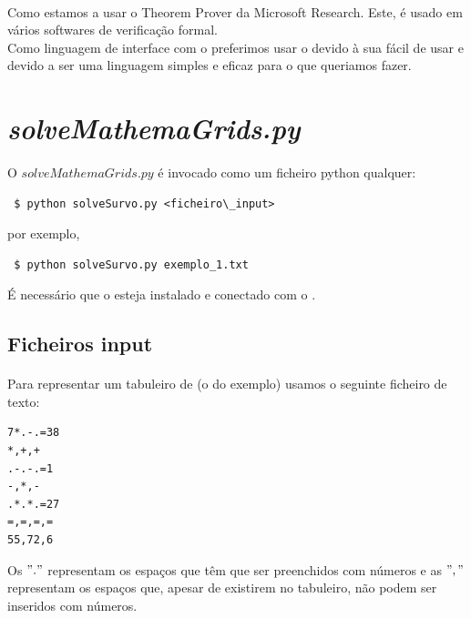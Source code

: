 \documentclass{article}
\begin{document}
\paragraph{} 
Como {} estamos a usar o {} Theorem Prover da Microsoft Research. Este, é usado em vários softwares de verificação formal. 
\\

Como linguagem de interface com o {} preferimos usar o {} {} devido à sua {} fácil de usar e devido a ser uma linguagem simples e eficaz para o que queriamos fazer.

\section{{\it{solveMathemaGrids.py}}}

\paragraph{} 
O $solveMathemaGrids.py$ é invocado como um ficheiro python qualquer:
\begin{verbatim}
 $ python solveSurvo.py <ficheiro\_input>
\end{verbatim}
por exemplo,
\begin{verbatim}
 $ python solveSurvo.py exemplo_1.txt
\end{verbatim}

É necessário que o {} esteja instalado e conectado com o {}.

\subsection{Ficheiros input}

\paragraph{} 

Para representar um tabuleiro de {} (o do exemplo) usamos o seguinte ficheiro de texto:
\begin{center}
\begin{verbatim}
7*.-.=38
*,+,+
.-.-.=1
-,*,-
.*.*.=27
=,=,=,=
55,72,6
\end{verbatim}
\end{center}

Os $"."$ representam os espaços que têm que ser preenchidos com números e as $","$ representam os espaços que, apesar de existirem no tabuleiro, não podem ser inseridos com números. 
\\
\end{document}
